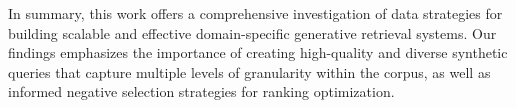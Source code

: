 In summary, this work offers a comprehensive investigation of data strategies for building scalable and effective domain-specific generative retrieval systems. Our findings emphasizes the importance of creating high-quality and diverse synthetic queries that capture multiple levels of granularity within the corpus, as well as informed negative selection strategies for ranking optimization.
